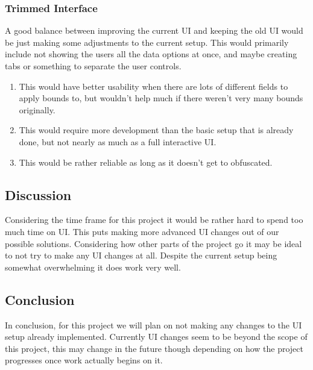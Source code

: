 \documentclass[onecolumn, draftclsnofoot,10pt, compsoc]{IEEEtran}
\begin{document}
\subsubsection{Trimmed Interface}
A good balance between improving the current UI and keeping the old UI would be just making some adjustments to the current setup. This would primarily include not showing the users all the data options at once, and maybe creating tabs or something to separate the user controls.
\begin{enumerate}
\item This would have better usability when there are lots of different fields to apply bounds to, but wouldn't help much if there weren't very many bounds originally.
\item This would require more development than the basic setup that is already done, but not nearly as much as a full interactive UI.
\item This would be rather reliable as long as it doesn't get to obfuscated.
\end{enumerate}

\subsection{Discussion}
Considering the time frame for this project it would be rather hard to spend too much time on UI. This puts making more advanced UI changes out of our possible solutions. Considering how other parts of the project go it may be ideal to not try to make any UI changes at all. Despite the current setup being somewhat overwhelming it does work very well.

\subsection{Conclusion}
In conclusion, for this project we will plan on not making any changes to the UI setup already implemented. Currently UI changes seem to be beyond the scope of this project, this may change in the future though depending on how the project progresses once work actually begins on it.
\end{document}
